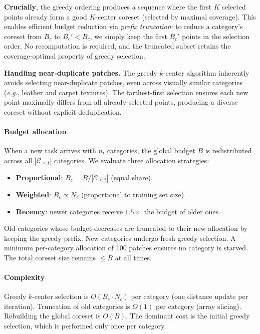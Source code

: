 \documentclass[conference]{IEEEtran}
\newcommand{\eg}{\textit{e.g.}}
\begin{document}
\textbf{Crucially}, the greedy ordering produces a sequence where the first $K$ selected points already form a good $K$-center coreset (selected by maximal coverage). This enables efficient budget reduction via \emph{prefix truncation}: to reduce a category's coreset from $B_c$ to $B_c' < B_c$, we simply keep the first $B_c'$ points in the selection order. No recomputation is required, and the truncated subset retains the coverage-optimal property of greedy selection.

\textbf{Handling near-duplicate patches.} The greedy $k$-center algorithm inherently avoids selecting near-duplicate patches, even across visually similar categories (\eg, leather and carpet textures). The farthest-first selection ensures each new point maximally differs from all already-selected points, producing a diverse coreset without explicit deduplication.

\paragraph{Budget allocation}
When a new task arrives with $n_t$ categories, the global budget $B$ is redistributed across all $|\mathcal{C}_{\leq t}|$ categories. We evaluate three allocation strategies:
\begin{itemize}
    \item \textbf{Proportional}: $B_c = B / |\mathcal{C}_{\leq t}|$ (equal share).
    \item \textbf{Weighted}: $B_c \propto N_c$ (proportional to training set size).
    \item \textbf{Recency}: newer categories receive $1.5\times$ the budget of older ones.
\end{itemize}

Old categories whose budget decreases are truncated to their new allocation by keeping the greedy prefix. New categories undergo fresh greedy selection. A minimum per-category allocation of 100 patches ensures no category is starved. The total coreset size remains $\leq B$ at all times.

\paragraph{Complexity}
Greedy $k$-center selection is $O(B_c \cdot N_c)$ per category (one distance update per iteration). Truncation of old categories is $O(1)$ per category (array slicing). Rebuilding the global coreset is $O(B)$. The dominant cost is the initial greedy selection, which is performed only once per category.
\end{document}
